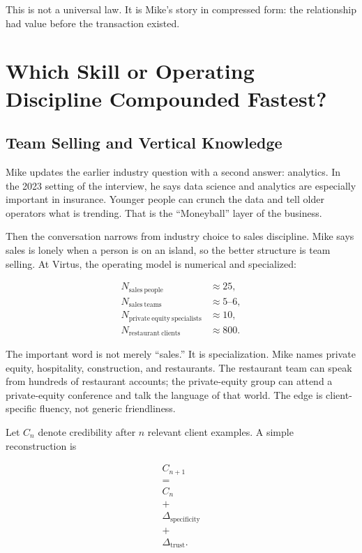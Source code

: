 \documentclass[11pt,oneside]{book}
\begin{document}
This is not a universal law. It is Mike's story in compressed form: the relationship had value before the transaction existed.

\chapter{Which Skill or Operating Discipline Compounded Fastest?}

\section{Team Selling and Vertical Knowledge}

Mike updates the earlier industry question with a second answer: analytics. In the 2023 setting of the interview, he says data science and analytics are especially important in insurance. Younger people can crunch the data and tell older operators what is trending. That is the ``Moneyball'' layer of the business.

Then the conversation narrows from industry choice to sales discipline. Mike says sales is lonely when a person is on an island, so the better structure is team selling. At Virtus, the operating model is numerical and specialized:

\begin{align}
N_{\mathrm{sales\ people}} &\approx 25,\\
N_{\mathrm{sales\ teams}} &\approx 5\text{--}6,\\
N_{\mathrm{private\ equity\ specialists}} &\approx 10,\\
N_{\mathrm{restaurant\ clients}} &\approx 800.
\end{align}

The important word is not merely ``sales.'' It is specialization. Mike names private equity, hospitality, construction, and restaurants. The restaurant team can speak from hundreds of restaurant accounts; the private-equity group can attend a private-equity conference and talk the language of that world. The edge is client-specific fluency, not generic friendliness.

Let \(C_n\) denote credibility after \(n\) relevant client examples. A simple reconstruction is

\begin{equation}
\begin{gathered}
C_{n+1}\\
=\\
C_n\\
+\\
\Delta_{\mathrm{specificity}}\\
+\\
\Delta_{\mathrm{trust}}.
\end{gathered}
\end{equation}
\end{document}
